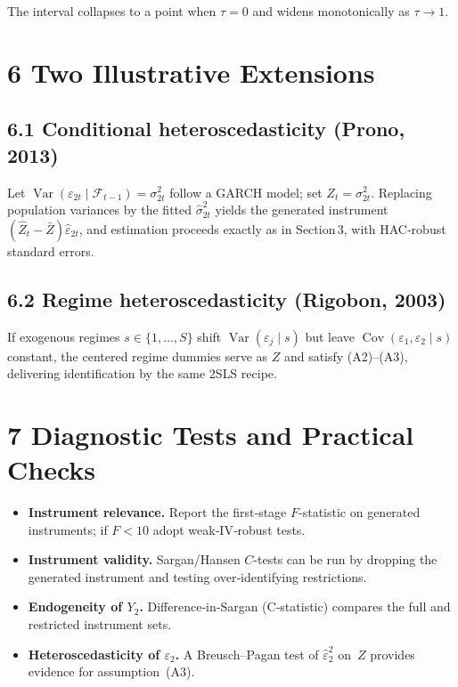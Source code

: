 \documentclass{article}
\newcommand{\cov}{\operatorname{Cov}}
\newcommand{\var}{\operatorname{Var}}
\theoremstyle{plain}
\begin{document}
The interval collapses to a point when $\tau=0$
and widens monotonically as $\tau\!\to\!1$.

\section*{6 \quad Two Illustrative Extensions}

\subsection*{6.1 \; Conditional heteroscedasticity (Prono, 2013)}

Let $\var(\varepsilon_{2t}\mid\mathcal F_{t-1})=\sigma_{2t}^2$
follow a GARCH model; set $Z_t=\sigma_{2t}^2$.
Replacing population variances by the fitted
$\hat\sigma_{2t}^2$ yields the generated instrument
\((\hat Z_t-\bar Z)\hat\varepsilon_{2t}\),
and estimation proceeds exactly as in Section 3,
with HAC‑robust standard errors.

\subsection*{6.2 \; Regime heteroscedasticity (Rigobon, 2003)}

If exogenous regimes $s\in\{1,\dots,S\}$ shift
$\var(\varepsilon_j\mid s)$ but leave
$\cov(\varepsilon_1,\varepsilon_2\mid s)$ constant,
the centered regime dummies serve as $Z$ and satisfy (A2)–(A3),
delivering identification by the same 2SLS recipe.

\section*{7 \quad Diagnostic Tests and Practical Checks}

\begin{itemize}\itemsep2pt
\item \textbf{Instrument relevance.}
      Report the first‑stage \(F\)-statistic on generated instruments;
      if \(F<10\) adopt weak‑IV‑robust tests.
\item \textbf{Instrument validity.}
      Sargan/Hansen \(C\)-tests can be run by dropping the generated instrument
      and testing over‑identifying restrictions.
\item \textbf{Endogeneity of \(Y_2\).}
      Difference‑in‑Sargan (C‑statistic) compares the full and
      restricted instrument sets.
\item \textbf{Heteroscedasticity of \(\varepsilon_2\).}
      A Breusch–Pagan test of \(\hat\varepsilon_2^2\) on~\(Z\)
      provides evidence for assumption (A3).
\end{itemize}
\end{document}
